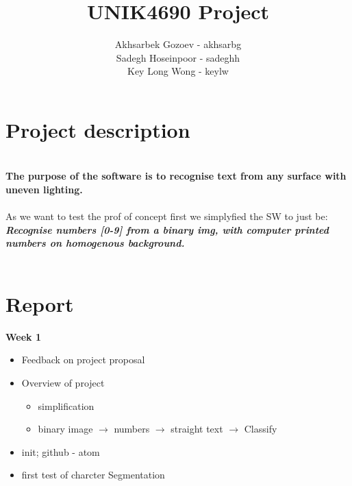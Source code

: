 \documentclass[11pt,a4paper,english]{article}
\title{UNIK4690 Project}
\author{
  Akhsarbek Gozoev  - akhsarbg \\
  Sadegh Hoseinpoor - sadeghh\\
  Key Long Wong - keylw
}
\newenvironment{loggentry}[2]%
{\noindent\textbf{#2}\marginnote{#1}\\}{\vspace{0.5cm}}
\begin{document}
\maketitle
\section*{Project description}
\noindent \\ \textbf{The purpose of the software is to recognise text from any
surface with uneven lighting.}
\noindent \\
\noindent \\ As we want to test the prof of concept first we simplyfied the SW
to just be:
\noindent \\ \textit{\textbf{Recognise numbers [0-9] from a binary img,
with computer printed numbers on homogenous background.}}
\noindent \\
\noindent \\ 




\newpage
\section*{Report}
\begin{loggentry}{19.04.18}{Week 1}
\begin{itemize}
  \item{Feedback on project proposal}
  \item{Overview of project}
    \begin{itemize}
     \item{simplification}
     \item{binary image $\rightarrow$ numbers $\rightarrow$ straight text $\rightarrow$ Classify}
   \end{itemize}
  \item{init; github - atom}
  \item{first test of charcter Segmentation}
\end{itemize}
\end{loggentry}
\end{document}
